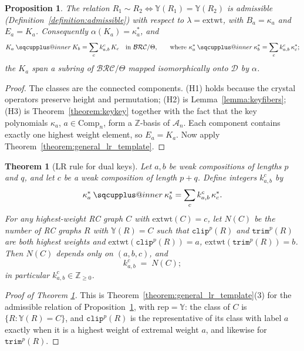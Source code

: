 \documentclass{amsart}
\makeatletter
\newcommand{\sqcupplus@inner}[2]{%
  \vcenter{\hbox{\ooalign{%
    \hfil$\m@th#1\sqcup$\hfil\cr
    \hfil\raisebox{0.15ex}{$\m@th#1\scriptscriptstyle+$}\hfil\cr
  }}}%
}
\newcommand{\sqcupplus}{\mathbin{\mathpalette\sqcupplus@inner\relax}}
\newtheorem{proposition}[lemma]{Proposition}
\newtheorem{theorem}{Theorem}[section]
\theoremstyle{definition}
\theoremstyle{remark}
\numberwithin{equation}{subsection}
\newcommand{\trm}{\mathtt{trim}}
\newcommand{\clp}{\mathtt{clip}}
\newcommand{\BRC}{\mathcal{BRC}}
\newcommand{\coma}{\mathcal{A}}
\newcommand{\dcoma}{\mathcal{D}}
\makeatother
\begin{document}
\begin{proposition}\label{proposition:keyadmissible}
The relation $R_1\sim R_2\iff\mathbb{Y}(R_1)=\mathbb{Y}(R_2)$ is admissible (Definition~\ref{definition:admissible}) with respect to $\lambda=\mathrm{extwt}$, with $B_a=\kappa_a$ and $E_a=K_a$. Consequently $\alpha(K_a)=\kappa_a^*$, and
$$K_a\sqcupplus K_b=\sum_ck_{a,b}^c\,K_c\quad\text{in }\BRC/\Theta\text{,}\qquad\text{where }\kappa_a^*\sqcupplus\kappa_b^*=\sum_ck_{a,b}^c\,\kappa_c^*\text{;}$$
the $K_a$ span a subring of $\BRC/\Theta$ mapped isomorphically onto $\dcoma$ by $\alpha$.
\end{proposition}
\begin{proof}
The classes are the connected components. (H1) holds because the crystal operators preserve height and permutation; (H2) is Lemma~\ref{lemma:keyfibers}; (H3) is Theorem~\ref{theorem:keykey} together with the fact that the key polynomials $\kappa_a$, $a\in\mathrm{Comp}_n$, form a $\mathbb{Z}$-basis of $\coma_n$. Each component contains exactly one highest weight element, so $E_a=K_a$. Now apply Theorem~\ref{theorem:general_lr_template}.
\end{proof}

\begin{theorem}[LR rule for dual keys]\label{theorem:LRkey}
Let $a,b$ be weak compositions of lengths $p$ and $q$, and let $c$ be a weak composition of length $p+q$. Define integers $k_{a,b}^c$ by
$$\kappa_a^* \sqcupplus \kappa_b^* = \sum_{c} k_{a,b}^c\,\kappa_c^*.$$
For any highest-weight RC graph $C$ with $\mathrm{extwt}(C)=c$, let $N(C)$ be the number of RC graphs $R$ with $\mathbb{Y}(R)=C$ such that $\clp^p(R)$ and $\trm^p(R)$ are both highest weights and $\mathrm{extwt}(\clp^p(R)) = a$, $\mathrm{extwt}(\trm^p(R)) = b$. Then $N(C)$ depends only on $(a,b,c)$, and
$$k_{a,b}^c \;=\; N(C);$$
in particular $k_{a,b}^c\in\mathbb{Z}_{\geq 0}$.
\end{theorem}

\begin{proof}[Proof of Theorem \ref{theorem:LRkey}]
This is Theorem~\ref{theorem:general_lr_template}(3) for the admissible relation of Proposition~\ref{proposition:keyadmissible}, with $\mathrm{rep}=\mathbb{Y}$: the class of $C$ is $\{R:\mathbb{Y}(R)=C\}$, and $\clp^p(R)$ is the representative of its class with label $a$ exactly when it is a highest weight of extremal weight $a$, and likewise for $\trm^p(R)$.
\end{proof}
\end{document}
